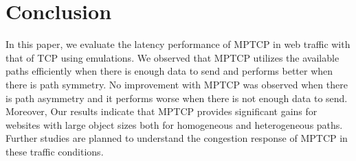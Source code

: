 \section{Conclusion}
\label{sec:conclusion}

In this paper, we evaluate the latency performance of MPTCP in web traffic with that of TCP using emulations. We observed that MPTCP utilizes the 
available paths efficiently when there is enough data to send and performs better when there is path symmetry. No improvement with MPTCP was observed
when there is path asymmetry and it performs worse when there is not enough data to send. Moreover, Our results indicate that MPTCP provides significant 
gains for websites with large object sizes both for homogeneous and heterogeneous paths. Further studies are planned to understand the congestion response 
of MPTCP in these traffic conditions. 





